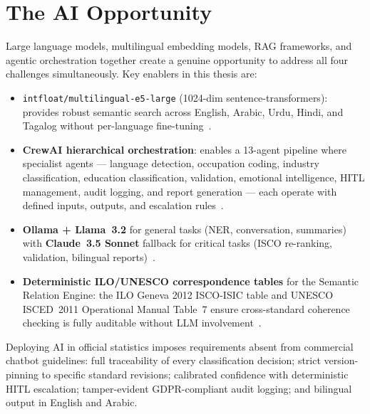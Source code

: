 \section{The AI Opportunity}
\label{sec:opportunity}

Large language models, multilingual embedding models, RAG frameworks, and
agentic orchestration together create a genuine opportunity to address all four
challenges simultaneously.
Key enablers in this thesis are:

\begin{itemize}
  \item \texttt{intfloat/\-multilingual-e5-large} (1024-dim sentence-transformers):
  provides robust semantic search across English, Arabic, Urdu, Hindi, and
  Tagalog without per-language fine-tuning~\cite{stump2025embedding}.

  \item \textbf{CrewAI hierarchical orchestration}: enables a 13-agent pipeline
  where specialist agents --- language detection, occupation coding, industry
  classification, education classification, validation, emotional intelligence,
  HITL management, audit logging, and report generation --- each operate with
  defined inputs, outputs, and escalation rules~\cite{crewai2024}.

  \item \textbf{Ollama + Llama~3.2} for general tasks (NER, conversation,
  summaries) with \textbf{Claude~3.5 Sonnet} fallback for critical tasks
  (ISCO re-ranking, validation, bilingual reports)~\cite{anthropic2024claude}.

  \item \textbf{Deterministic ILO/UNESCO correspondence tables} for the
  Semantic Relation Engine: the ILO Geneva 2012 ISCO-ISIC table and UNESCO
  ISCED~2011 Operational Manual Table~7 ensure cross-standard coherence
  checking is fully auditable without LLM involvement~\cite{ilo2012isco_v1,unesco2012isced}.
\end{itemize}

Deploying AI in official statistics imposes requirements absent from commercial
chatbot guidelines: full traceability of every classification decision;
strict version-pinning to specific standard revisions; calibrated confidence
with deterministic HITL escalation; tamper-evident GDPR-compliant audit
logging; and bilingual output in English and Arabic.


